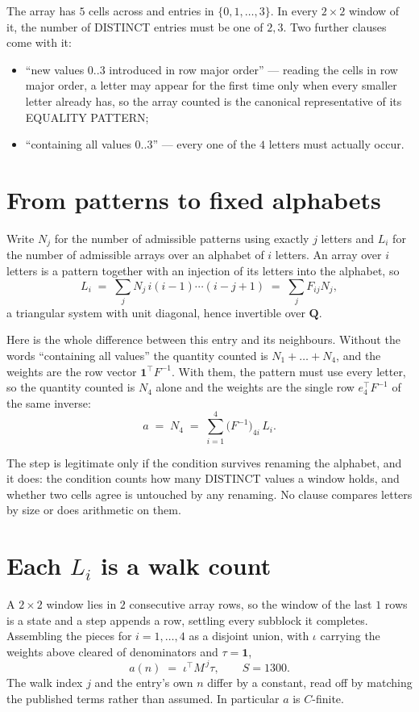 \documentclass[11pt,a4paper]{article}
\theoremstyle{plain}
\theoremstyle{definition}
\begin{document}
The array has $5$ cells across and entries in $\{0,1,\dots,3\}$. In every
$2\times2$ window of it, the number of DISTINCT entries must be one of $2, 3$. Two
further clauses come with it:

\begin{itemize}
\item ``new values $0..3$ introduced in row major order'' --- reading the cells in row major
order, a letter may appear for the first time only when every smaller letter already has, so
the array counted is the canonical representative of its EQUALITY PATTERN;
\item ``containing all values $0..3$'' --- every one of the $4$ letters must actually
occur.
\end{itemize}


\section{From patterns to fixed alphabets}

Write $N_j$ for the number of admissible patterns using exactly $j$ letters and $L_i$ for the
number of admissible arrays over an alphabet of $i$ letters. An array over $i$ letters is a
pattern together with an injection of its letters into the alphabet, so
\[
L_i\;=\;\sum_{j} N_j\,i(i-1)\cdots(i-j+1)\;=\;\sum_j F_{ij}N_j ,
\]
a triangular system with unit diagonal, hence invertible over $\mathbf{Q}$.

Here is the whole difference between this entry and its neighbours. Without the words
``containing all values'' the quantity counted is $N_1+\dots+N_{4}$, and the weights are
the row vector $\mathbf{1}^{\!\top}F^{-1}$. With them, the pattern must use every letter,
so the quantity counted is $N_{4}$ alone and the weights are the single row
$e_{4}^{\!\top}F^{-1}$ of the same inverse:
\[
a\;=\;N_{4}\;=\;\sum_{i=1}^{4}\bigl(F^{-1}\bigr)_{4i}\,L_i .
\]

The step is legitimate only if the condition survives renaming the alphabet, and it does: the
condition counts how many DISTINCT values a window holds, and whether two cells agree is
untouched by any renaming. No clause compares letters by size or does arithmetic on them.

\section{Each $L_i$ is a walk count}

A $2\times2$ window lies in $2$ consecutive array rows, so the window of the last
$1$ rows is a state and a step appends a row, settling every subblock it completes.
Assembling the pieces for $i=1,\dots,4$ as a disjoint union, with $\iota$ carrying the
weights above cleared of denominators and $\tau=\mathbf{1}$,
\[
a(n)\;=\;\iota^{\!\top}M^{\,j}\tau ,\qquad S=1300.
\]
The walk index $j$ and the entry's own $n$ differ by a constant, read off by matching the
published terms rather than assumed. In particular $a$ is $C$-finite.
\end{document}
